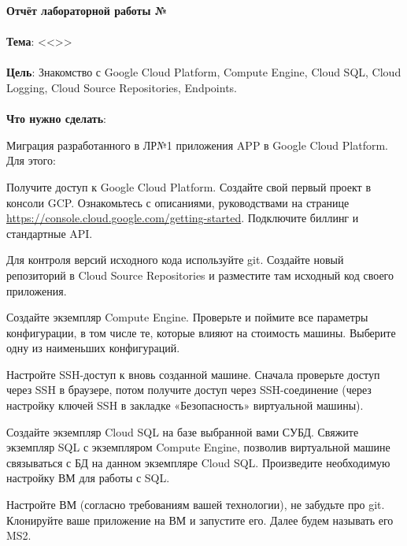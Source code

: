 \documentclass[12pt, a4paper, simple]{eskdtext}
\begin{document}
  

  \begin{center}
    \textbf{Отчёт лабораторной работы №\envReportLabNumber}
  \end{center}

  \paragraph{} \textbf{Тема}: <<\envReportTitle>>

  \paragraph{} \textbf{Цель}:
  Знакомство с Google Cloud Platform, Compute Engine, Cloud SQL, Cloud Logging, Cloud Source Repositories, Endpoints.

  \paragraph{} \textbf{Что нужно сделать}:

  Миграция разработанного в ЛР№1 приложения APP в Google Cloud Platform. Для этого:

  Получите доступ к Google Cloud Platform. Создайте свой первый проект в консоли GCP.
  Ознакомьтесь с описаниями, руководствами на странице \url{https://console.cloud.google.com/getting-started}.
  Подключите биллинг и стандартные API.

  Для контроля версий исходного кода используйте git.
  Создайте новый репозиторий в Cloud Source Repositories и разместите там исходный код своего приложения.

  Создайте экземпляр Compute Engine.
  Проверьте и поймите все параметры конфигурации, в том числе те, которые влияют на стоимость машины.
  Выберите одну из наименьших конфигураций. 

  Настройте SSH-доступ к вновь созданной машине.
  Сначала проверьте доступ через SSH в браузере, потом получите доступ через SSH-соединение
  (через настройку ключей SSH в закладке «Безопасность» виртуальной машины).

  Создайте экземпляр Cloud SQL на базе выбранной вами СУБД.
  Свяжите экземпляр SQL с экземпляром Compute Engine, позволив виртуальной машине связываться с БД на данном экземпляре Cloud SQL.
  Произведите необходимую настройку ВМ для работы с SQL.

  Настройте ВМ (согласно требованиям вашей технологии), не забудьте про git.
  Клонируйте ваше приложение на ВМ и запустите его. Далее будем называть его MS2.
\end{document}
